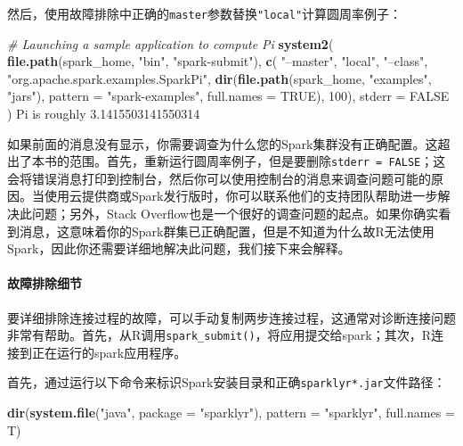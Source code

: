 \documentclass[
]{article}
\newenvironment{Shaded}{\begin{snugshade}}{\end{snugshade}}
\newcommand{\CommentTok}[1]{\textcolor[rgb]{0.56,0.35,0.01}{\textit{#1}}}
\newcommand{\DataTypeTok}[1]{\textcolor[rgb]{0.13,0.29,0.53}{#1}}
\newcommand{\DecValTok}[1]{\textcolor[rgb]{0.00,0.00,0.81}{#1}}
\newcommand{\FloatTok}[1]{\textcolor[rgb]{0.00,0.00,0.81}{#1}}
\newcommand{\KeywordTok}[1]{\textcolor[rgb]{0.13,0.29,0.53}{\textbf{#1}}}
\newcommand{\NormalTok}[1]{#1}
\newcommand{\OtherTok}[1]{\textcolor[rgb]{0.56,0.35,0.01}{#1}}
\newcommand{\StringTok}[1]{\textcolor[rgb]{0.31,0.60,0.02}{#1}}
\begin{document}
然后，使用故障排除中正确的\texttt{master}参数替换\texttt{"local"}计算圆周率例子：

\begin{Shaded}
\begin{Highlighting}[]
\CommentTok{# Launching a sample application to compute Pi}
\KeywordTok{system2}\NormalTok{(}
\KeywordTok{file.path}\NormalTok{(spark_home, }\StringTok{"bin"}\NormalTok{, }\StringTok{"spark-submit"}\NormalTok{),}
\KeywordTok{c}\NormalTok{(}
\StringTok{"--master"}\NormalTok{, }\StringTok{"local"}\NormalTok{,}
\StringTok{"--class"}\NormalTok{, }\StringTok{"org.apache.spark.examples.SparkPi"}\NormalTok{,}
\KeywordTok{dir}\NormalTok{(}\KeywordTok{file.path}\NormalTok{(spark_home, }\StringTok{"examples"}\NormalTok{, }\StringTok{"jars"}\NormalTok{),}
\DataTypeTok{pattern =} \StringTok{"spark-examples"}\NormalTok{, }\DataTypeTok{full.names =} \OtherTok{TRUE}\NormalTok{),}
\DecValTok{100}\NormalTok{),}
\DataTypeTok{stderr =} \OtherTok{FALSE}
\NormalTok{)}
\NormalTok{Pi is roughly }\FloatTok{3.1415503141550314}
\end{Highlighting}
\end{Shaded}

如果前面的消息没有显示，你需要调查为什么您的Spark集群没有正确配置。这超出了本书的范围。首先，重新运行圆周率例子，但是要删除\texttt{stderr\ =\ FALSE}；这会将错误消息打印到控制台，然后你可以使用控制台的消息来调查问题可能的原因。当使用云提供商或Spark发行版时，你可以联系他们的支持团队帮助进一步解决此问题；另外，Stack
Overflow也是一个很好的调查问题的起点。如果你确实看到消息，这意味着你的Spark群集已正确配置，但是不知道为什么故R无法使用Spark，因此你还需要详细地解决此问题，我们接下来会解释。

\hypertarget{ux6545ux969cux6392ux9664ux7ec6ux8282}{%
\paragraph{故障排除细节}\label{ux6545ux969cux6392ux9664ux7ec6ux8282}}

要详细排除连接过程的故障，可以手动复制两步连接过程，这通常对诊断连接问题非常有帮助。首先，从R调用\texttt{spark\_submit()}，将应用提交给spark；其次，R连接到正在运行的spark应用程序。

首先，通过运行以下命令来标识Spark安装目录和正确\texttt{sparklyr*.jar}文件路径：

\begin{Shaded}
\begin{Highlighting}[]
\KeywordTok{dir}\NormalTok{(}\KeywordTok{system.file}\NormalTok{(}\StringTok{"java"}\NormalTok{, }\DataTypeTok{package =} \StringTok{"sparklyr"}\NormalTok{), }\DataTypeTok{pattern =} \StringTok{"sparklyr"}\NormalTok{, }\DataTypeTok{full.names =}\NormalTok{ T)}
\end{Highlighting}
\end{Shaded}
\end{document}
